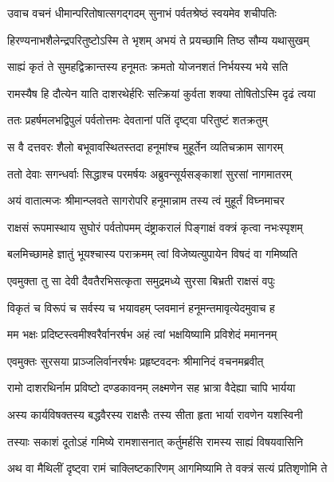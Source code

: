 \twolineshloka
{उवाच वचनं धीमान्परितोषात्सगद्गदम्}
{सुनाभं पर्वतश्रेष्ठं स्वयमेव शचीपतिः} %

\twolineshloka
{हिरण्यनाभशैलेन्द्रपरितुष्टोऽस्मि ते भृशम्}
{अभयं ते प्रयच्छामि तिष्ठ सौम्य यथासुखम्} %

\twolineshloka
{साह्यं कृतं ते सुमहद्विक्रान्तस्य हनूमतः}
{क्रमतो योजनशतं निर्भयस्य भये सति} %

\twolineshloka
{रामस्यैष हि दौत्येन याति दाशरथेर्हरिः}
{सत्क्रियां कुर्वता शक्या तोषितोऽस्मि दृढं त्वया} %

\twolineshloka
{ततः प्रहर्षमलभद्विपुलं पर्वतोत्तमः}
{देवतानां पतिं दृष्ट्वा परितुष्टं शतक्रतुम्} %

\twolineshloka
{स वै दत्तवरः शैलो बभूवावस्थितस्तदा}
{हनूमांश्च मुहूर्तेन व्यतिचक्राम सागरम्} %

\twolineshloka
{ततो देवाः सगन्धर्वाः सिद्धाश्च परमर्षयः}
{अब्रुवन्सूर्यसङ्काशां सुरसां नागमातरम्} %

\twolineshloka
{अयं वातात्मजः श्रीमान्प्लवते सागरोपरि}
{हनूमान्नाम तस्य त्वं मुहूर्तं विघ्नमाचर} %

\twolineshloka
{राक्षसं रूपमास्थाय सुघोरं पर्वतोपमम्}
{दंष्ट्राकरालं पिङ्गाक्षं वक्त्रं कृत्वा नभःस्पृशम्} %

\twolineshloka
{बलमिच्छामहे ज्ञातुं भूयश्चास्य पराक्रमम्}
{त्वां विजेष्यत्युपायेन विषदं वा गमिष्यति} %

\twolineshloka
{एवमुक्ता तु सा देवी दैवतैरभिसत्कृता}
{समुद्रमध्ये सुरसा बिभ्रती राक्षसं वपुः} %

\twolineshloka
{विकृतं च विरूपं च सर्वस्य च भयावहम्}
{प्लवमानं हनूमन्तमावृत्येदमुवाच ह} %

\twolineshloka
{मम भक्षः प्रदिष्टस्त्वमीश्वरैर्वानरर्षभ}
{अहं त्वां भक्षयिष्यामि प्रविशेदं ममाननम्} %

\twolineshloka
{एवमुक्तः सुरसया प्राञ्जलिर्वानरर्षभः}
{प्रहृष्टवदनः श्रीमानिदं वचनमब्रवीत्} %

\twolineshloka
{रामो दाशरथिर्नाम प्रविष्टो दण्डकावनम्}
{लक्ष्मणेन सह भ्रात्रा वैदेह्या चापि भार्यया} %

\twolineshloka
{अस्य कार्यविषक्तस्य बद्धवैरस्य राक्षसैः}
{तस्य सीता हृता भार्या रावणेन यशस्विनी} %

\twolineshloka
{तस्याः सकाशं दूतोऽहं गमिष्ये रामशासनात्}
{कर्तुमर्हसि रामस्य साह्यं विषयवासिनि} %

\twolineshloka
{अथ वा मैथिलीं दृष्ट्वा रामं चाक्लिष्टकारिणम्}
{आगमिष्यामि ते वक्त्रं सत्यं प्रतिशृणोमि ते} %

